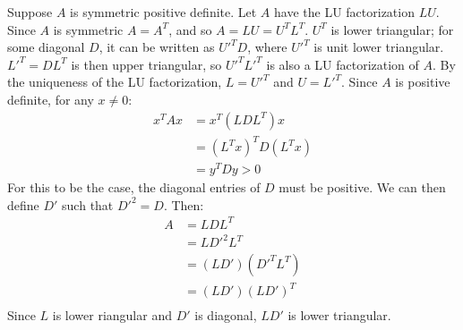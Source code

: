 \documentclass{article}
\begin{document}
\problem{}
Suppose $A$ is symmetric positive definite. Let $A$ have the LU factorization $LU$. Since $A$ is symmetric $A = A^T$, and so $A = LU = U^TL^T$. $U^T$ is lower triangular; for some diagonal $D$, it can be written as ${U'}^TD$, where ${U'}^T$ is unit lower triangular. ${L'}^T = DL^T$ is then upper triangular, so ${U'}^T{L'}^T$ is also a LU factorization of $A$. By the uniqueness of the LU factorization, $L = {U'}^T$ and $U = {L'}^T$. Since $A$ is positive definite, for any $x \neq 0$:
\begin{align*}
    x^TAx & = x^T(LDL^T)x \\
    & = (L^Tx)^T D (L^Tx) \\
    & = y^T Dy > 0
\end{align*} 
For this to be the case, the diagonal entries of $D$ must be positive. We can then define $D'$ such that ${D'}^2 = D$. Then:
\begin{align*}
    A & = LDL^T \\
    & = L{D'}^2L^T \\
    & = (LD')(D'^TL^T) \\
    & = (LD')(LD')^T \\
\end{align*}
Since $L$ is lower riangular and $D'$ is diagonal, $LD'$ is lower triangular.
\end{document}
